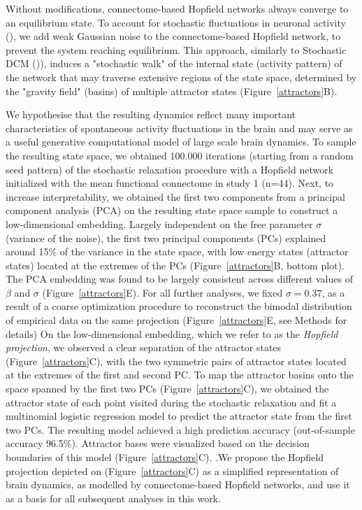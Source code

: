 \documentclass{article}
\begin{document}
Without modifications, connectome-based Hopfield networks always converge to an equilibrium state. To account for stochastic fluctuations in neuronal activity (\href{https://doi.org/10.1098/rstb.2005.1638}{}), we add weak Gaussian noise to the connectome-based Hopfield network, to prevent the system reaching equilibrium. This approach, similarly to Stochastic DCM (\href{https://doi.org/10.1016/j.neuroimage.2012.04.061}{})), induces a "stochastic walk" of the internal state (activity pattern) of the network that may traverse extensive regions of the state space, determined by the "gravity field" (basins) of multiple attractor states (Figure~\ref{attractors}B).

We hypothesise that the resulting dynamics reflect many important characteristics of spontaneous activity fluctuations in the brain and may serve as a useful generative computational model of large scale brain dynamics. To sample the resulting state space, we obtained 100.000 iterations (starting from a random seed pattern) of the stochastic relaxation procedure with a Hopfield network initialized with the mean functional connectome in study 1 (n=44).
Next, to increase interpretability, we obtained the first two components from a principal component analysis (PCA) on the resulting state space sample to construct a low-dimensional embedding. Largely independent on the free parameter $\sigma$ (variance of the noise), the first two principal components (PCs) explained around 15\% of the variance in the state space, with low energy states (attractor states) located at the extremes of the PCs (Figure~\ref{attractors}B, bottom plot).
The PCA embedding was found to be largely consistent across different values of $\beta$ and $\sigma$ (Figure~\ref{attractors}E). For all further analyses, we fixed $\sigma=0.37$, as a result of a coarse optimization procedure to reconstruct the bimodal distribution of empirical data on the same projection (Figure~\ref{attractors}E, see Methods for details)
On the low-dimensional embedding, which we refer to as the \textit{Hopfield projection}, we observed a clear separation of the attractor states (Figure~\ref{attractors}C), with the two symmetric pairs of attractor states located at the extremes of the first and second PC.
To map the attractor basins onto the space spanned by the first two PCs (Figure~\ref{attractors}C), we obtained the attractor state of each point visited during the stochastic relaxation and fit a multinomial logistic regression model to predict the attractor state from the first two PCs. The resulting model achieved a high prediction accuracy (out-of-sample accuracy 96.5\%). Attractor bases were visualized based on the decision boundaries of this  model (Figure~\ref{attractors}C).
.We propose the Hopfield projection depicted on (Figure~\ref{attractors}C) as a simplified representation of brain dynamics, as modelled by connectome-based Hopfield networks, and use it as a basis for all subsequent analyses in this work.
\end{document}

